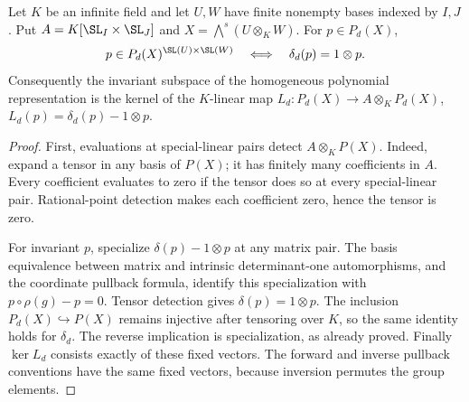 \begin{lemma}
\label{lem:balanced-invariant-kernel}
\leanok
Let $K$ be an infinite field and let $U,W$ have finite nonempty bases
indexed by $I,J$. Put $A=K[\SL_I\times\SL_J]$ and
$X=\bigwedge^s(U\otimes_K W)$. For $p\in P_d(X)$,
\[
 p\in P_d(X)^{\SL(U)\times\SL(W)}
 \quad\Longleftrightarrow\quad \delta_d(p)=1\otimes p.
\]
Consequently the invariant subspace of the homogeneous polynomial
representation is the kernel of the $K$-linear map
$L_d:P_d(X)\to A\otimes_KP_d(X)$, $L_d(p)=\delta_d(p)-1\otimes p$.
\end{lemma}
\begin{proof}
First, evaluations at special-linear pairs detect $A\otimes_KP(X)$.
Indeed, expand a tensor in any basis of $P(X)$; it has finitely many
coefficients in $A$. Every coefficient evaluates to zero if the tensor
does so at every special-linear pair. Rational-point detection makes
each coefficient zero, hence the tensor is zero.

For invariant $p$, specialize $\delta(p)-1\otimes p$ at any matrix pair.
The basis equivalence between matrix and intrinsic determinant-one
automorphisms, and the coordinate pullback formula, identify this
specialization with $p\circ\rho(g)-p=0$. Tensor detection gives
$\delta(p)=1\otimes p$. The inclusion $P_d(X)\hookrightarrow P(X)$
remains injective after tensoring over $K$, so the same identity holds
for $\delta_d$. The reverse implication is specialization, as already
proved. Finally $\ker L_d$ consists exactly of these fixed vectors.
The forward and inverse pullback conventions have the same fixed
vectors, because inversion permutes the group elements.
\end{proof}

